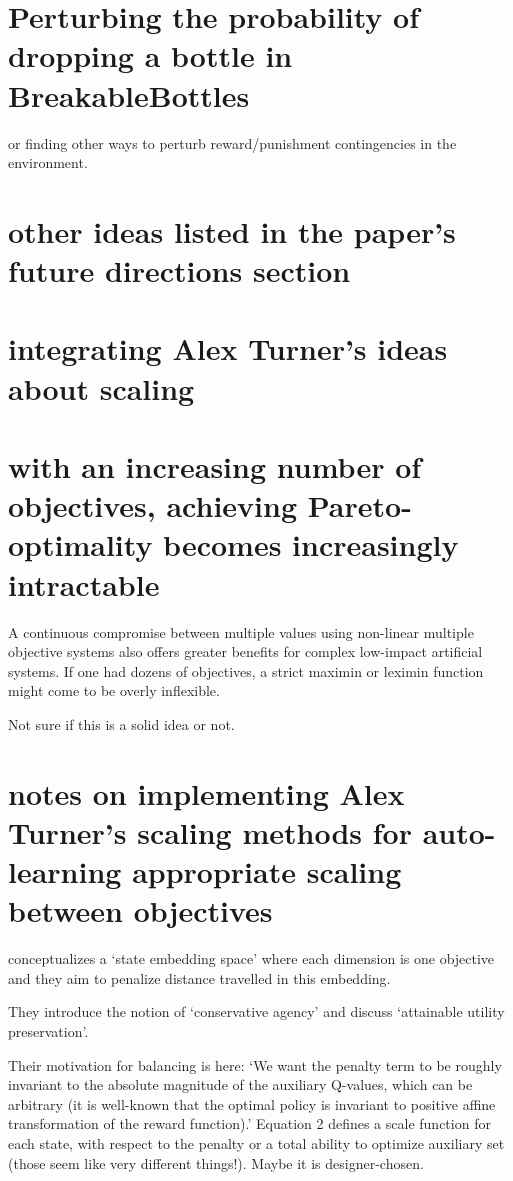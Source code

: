 
\section{Perturbing the probability of dropping a bottle in BreakableBottles}

or finding other ways to perturb reward/punishment contingencies in the environment.

\section{other ideas listed in the paper's future directions section}

\section{integrating Alex Turner's ideas about scaling}

\cite{turner_conservative_2020}

\section{with an increasing number of objectives, achieving Pareto-optimality becomes increasingly intractable}

A continuous compromise between multiple values using non-linear multiple objective systems also offers greater benefits for complex low-impact artificial systems. If one had dozens of objectives, a strict maximin or leximin function might come to be overly inflexible.

Not sure if this is a solid idea or not.

\section{notes on implementing Alex Turner's scaling methods for auto-learning appropriate scaling between objectives}

conceptualizes a `state embedding space' where each dimension is one objective and they aim to penalize distance travelled in this embedding.

They introduce the notion of `conservative agency' and discuss `attainable utility preservation'.

Their motivation for balancing is here: `We want the penalty term to be roughly invariant to the absolute magnitude of the auxiliary Q-values, which can be arbitrary (it is well-known that the optimal policy is invariant to positive affine transformation of the reward function).'
Equation 2 defines a scale function for each state, with respect to the penalty or a total ability to optimize auxiliary set (those seem like very different things!). Maybe it is designer-chosen.

